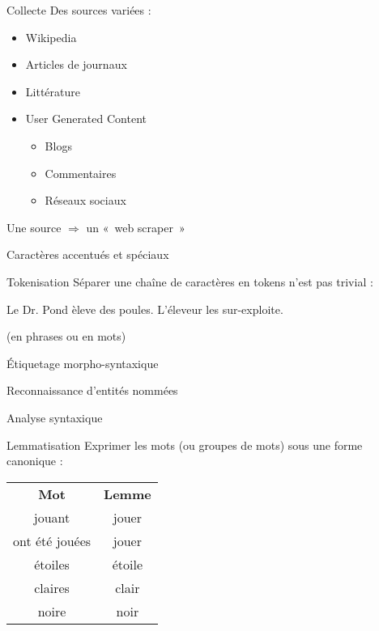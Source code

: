 \begin{frame}{Collecte}
  Des sources variées :
  \begin{itemize}
  \item Wikipedia
  \item Articles de journaux
  \item Littérature
  \item User Generated Content
    \begin{itemize}
    \item Blogs
    \item Commentaires
    \item Réseaux sociaux
    \end{itemize}
  \end{itemize}
  Une source $\Rightarrow$ un «~web scraper~»
\end{frame}

\begin{frame}{Caractères accentués et spéciaux}
\end{frame}

\begin{frame}{Tokenisation}
  Séparer une chaîne de caractères en tokens n'est pas trivial :

  \begin{center}
    Le Dr. Pond èleve des poules. L'éleveur les sur-exploite.
  \end{center}

  (en phrases ou en mots)
\end{frame}

\begin{frame}{Étiquetage morpho-syntaxique}
\end{frame}

\begin{frame}{Reconnaissance d'entités nommées}
\end{frame}

\begin{frame}{Analyse syntaxique}
\end{frame}

\begin{frame}{Lemmatisation}
  Exprimer les mots (ou groupes de mots) sous une forme canonique : \\

  \centering
  \begin{tabular}{cc}
    \textbf{Mot} & \textbf{Lemme} \\
    jouant & jouer \\
    ont été jouées & jouer \\
    étoiles & étoile \\
    claires & clair \\
    noire & noir
  \end{tabular}
\end{frame}


